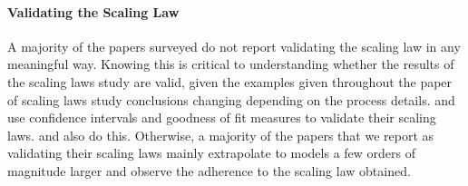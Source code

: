 \paragraph{Validating the Scaling Law} A majority of the papers surveyed do not report validating the scaling law in any meaningful way. Knowing this is critical to understanding whether the results of the scaling laws study are valid, given the examples given throughout the paper of scaling laws study conclusions changing depending on the process details. \citet{porian2024resolving} and \citet{alabdulmohsin2022revisiting} use confidence intervals and goodness of fit measures to validate their scaling laws. \citet{ghorbani2021scaling} and \citet{bansal2022data} also do this. Otherwise, a majority of the papers that we report as validating their scaling laws mainly extrapolate to models a few orders of magnitude larger and observe the adherence to the scaling law obtained. 





